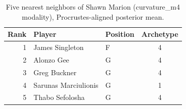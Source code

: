 \begin{table}[htbp]
  \centering\small
  \begin{tabular}{rllc}
    \toprule
    Rank & Player & Position & Archetype \\
    \midrule
    1 & James Singleton & F & 4 \\
    2 & Alonzo Gee & G & 4 \\
    3 & Greg Buckner & G & 4 \\
    4 & Sarunas Marciulionis & G & 1 \\
    5 & Thabo Sefolosha & G & 4 \\
    \bottomrule
  \end{tabular}
  \caption{Five nearest neighbors of Shawn Marion (curvature_m4 modality), Procrustes-aligned posterior mean.}
  \label{tab:Shawn_Marion_neighbors_curvature_m4}
\end{table}

